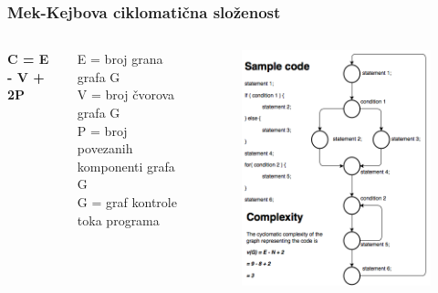 \documentclass{beamer}
\begin{document}
\begin{frame}
\frametitle{Mek-Kejbova ciklomatična složenost}

\begin{columns}[c]


\begin{center}
\textbf{C = E - V + 2P} 
\end{center}

E = broj grana grafa G \\
V = broj čvorova grafa G \\
P = broj povezanih komponenti grafa G \\
G = graf kontrole toka programa 

\begin{figure}
\includegraphics[width=1\linewidth]{mccabe.png}
\end{figure}

\end{columns}

\end{frame}
\end{document}
